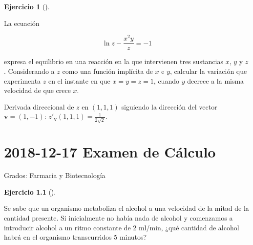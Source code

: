 \documentclass[
  a4paper,
]{scrreport}
\theoremstyle{definition}
\newtheorem{exercise}{Ejercicio}[chapter]
\theoremstyle{remark}
\begin{document}
\begin{exercise}[]\protect\hypertarget{exr-4}{}\label{exr-4}

La ecuación

\[
\ln z - \frac{x^2y}{z}=-1
\]

expresa el equilibrio en una reacción en la que intervienen tres
sustancias \(x\), \(y\) y \(z\). Considerando a \(z\) como una función
implícita de \(x\) e \(y\), calcular la variación que experimenta \(z\)
en el instante en que \(x=y=z=1\), cuando \(y\) decrece a la misma
velocidad de que crece \(x\).

\end{exercise}

\begin{tcolorbox}[enhanced jigsaw, opacitybacktitle=0.6, titlerule=0mm, bottomtitle=1mm, toptitle=1mm, breakable, bottomrule=.15mm, left=2mm, opacityback=0, toprule=.15mm, leftrule=.75mm, colframe=quarto-callout-tip-color-frame, coltitle=black, rightrule=.15mm, colback=white, title=\textcolor{quarto-callout-tip-color}{\faLightbulb}\hspace{0.5em}{Solución}, arc=.35mm, colbacktitle=quarto-callout-tip-color!10!white]

Derivada direccional de \(z\) en \((1,1,1)\) siguiendo la dirección del
vector \(\mathbf{v}=(1,-1)\):
\(z'_\mathbf{v}(1,1,1)=\frac{1}{2\sqrt{2}}\).

\end{tcolorbox}


\chapter{\texorpdfstring{2018-12-17 Examen de
Cálculo}{2018-12-17  Examen de Cálculo}}\label{examen-de-cuxe1lculo-4}

Grados: Farmacia y Biotecnología

\begin{exercise}[]\protect\hypertarget{exr-1}{}\label{exr-1}

Se sabe que un organismo metaboliza el alcohol a una velocidad de la
mitad de la cantidad presente. Si inicialmente no había nada de alcohol
y comenzamos a introducir alcohol a un ritmo constante de 2 ml/min, ¿qué
cantidad de alcohol habrá en el organismo transcurridos 5 minutos?

\end{exercise}
\end{document}
